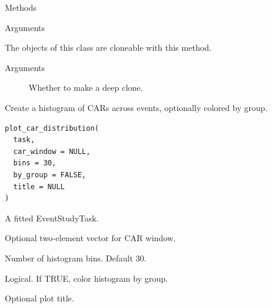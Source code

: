 \documentclass[a4paper]{book}
\begin{document}
\begin{Section}{Methods}
\begin{SubSection}{}
\begin{SubSubSection}{Arguments}
\end{SubSubSection}

\end{SubSection}




\hypertarget{method-PatellZTest-clone}{}
%
\begin{SubSection}{}
The objects of this class are cloneable with this method.
%

%
\begin{SubSubSection}{Arguments}

\begin{description}

\item[] Whether to make a deep clone.

\end{description}



\end{SubSubSection}

\end{SubSection}


\end{Section}
%
\begin{Description}
Create a histogram of CARs across events, optionally colored by group.
\end{Description}
%
\begin{Usage}
\begin{verbatim}
plot_car_distribution(
  task,
  car_window = NULL,
  bins = 30,
  by_group = FALSE,
  title = NULL
)
\end{verbatim}
\end{Usage}
%
\begin{Arguments}
\begin{ldescription}
\item[\code{task}] A fitted EventStudyTask.

\item[\code{car\_window}] Optional two-element vector for CAR window.

\item[\code{bins}] Number of histogram bins. Default 30.

\item[\code{by\_group}] Logical. If TRUE, color histogram by group.

\item[\code{title}] Optional plot title.
\end{ldescription}
\end{Arguments}
\end{document}
